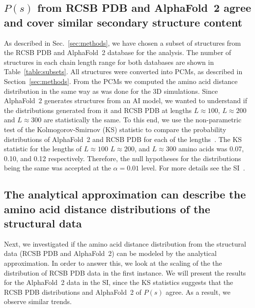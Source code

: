 \documentclass[
reprint,
twocolumn,
amsmath,amssymb,superscriptaddress,aps,
pre]{revtex4-1}
\begin{document}
\subsection{$P(s)$ from RCSB PDB and AlphaFold~2 agree and cover similar secondary structure content}
As described in Sec.~\ref{sec:methods}, we have chosen a subset of structures from the RCSB PDB and AlphaFold~2 database for the analysis. The number of structures in each chain length range for both databases are shown in Table~\ref{table:subsets}. All structures were converted into PCMs, as described in Section~\ref{sec:methods}. From the PCMs we computed the amino acid distance distribution in the same way as was done for the 3D simulations. Since AlphaFold~2 generates structures from an AI model, we wanted to understand if the distributions generated from it and RCSB PDB at lengths $L\approx 100$, $L \approx 200$ and $L \approx 300$ are statistically the same. 
To this end, we use the non-parametric test of the Kolmogorov-Smirnov (KS) statistic to compare the probability distributions of AlphaFold~2 and RCSB PDB for each of the lengths~\cite{2008kolmogorov}. The KS statistic for the lengths of $L \approx 100$ $L \approx 200$, and $L \approx 300$ amino acids was 0.07, 0.10, and 0.12 respectively. Therefore, the null hypotheses for the distributions being the same was accepted at the $\alpha=0.01$ level. For more details see the SI~\cite{SI}. 

\begin{table}[htb]
\centering
\setlength{\tabcolsep}{5pt}
 \caption{The number of structures used for the analysis from the RCSB PDB and AlphaFold 2 database, after filtering.}
\label{table:subsets}
\end{table}


\subsection{The analytical approximation can describe the amino acid distance distributions of the structural data}
Next, we investigated if the amino acid distance distribution from the structural data (RCSB PDB and AlphaFold~2) can be modeled by the analytical approximation.
In order to answer this, we look at the scaling of the the distribution of RCSB PDB data in the first instance. We will present the results for the AlphaFold~2 data in the SI, since the KS statistics suggests that the RCSB PDB distributions and AlphaFold~2 of $P(s)$ agree. As a result, we observe similar trends. 
\end{document}
